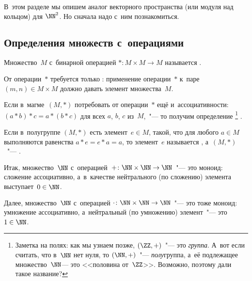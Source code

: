 
В~этом разделе мы опишем аналог векторного пространства (или модуля над кольцом) для $\NN^2$. Но сначала надо с~ним познакомиться.

\subsection{Определения множеств с~операциями}

\begin{definition}
	Множество~$M$ с~бинарной операцией $* \colon M \times M \to M$ называется .
	\label{<+label+>}
\end{definition}
От операции~$*$ требуется только : применение операции~$*$ к~паре $(m, n) \in M \times M$ должно давать элемент множества~$M$.

\begin{definition}
	Если в~магме~$(M, *)$ потребовать от операции~$*$ ещё и~ассоциативности: $(a
	* b) * c = a * (b * c)$ для всех $a$, $b$, $c$ из~$M$,~"--- то получим
	определение %
	\footnote{%
		Заметка на полях: как мы узнаем позже, $(\ZZ, +)$~"--- это \emph{группа}.
		А~вот если считать, что в~$\NN$ нет нуля, то $(\NN, +)$~"---
		\emph{полу}группа, а~её подлежащее множество~$\NN$--- это <<половина
		от~$\ZZ$>>. Возможно, поэтому дали такое название?
	}%
	.
\end{definition}

\begin{definition}
	Если в~полугруппе $(M, *)$ есть элемент~$e \in M$, такой, что для любого $a \in M$ выполняются равенства $a * e = e * a = a$, то элемент~$e$ называется , а~$(M, *)$~"--- .
	\label{<+label+>}
\end{definition}

Итак, множество~$\NN$ с~операцией~$+ \colon \NN \times \NN \to \NN$~"--- это моноид: сложение ассоциативно, а~в~качестве нейтрального (по сложению) элемента выступает~$0 \in \NN$.

Далее, множество~$\NN$ с~операцией $\cdot \colon \NN \times \NN \to \NN$~"--- это тоже моноид: умножение ассоциативно, а~нейтральный (по умножению) элемент~"--- это $1 \in \NN$.

